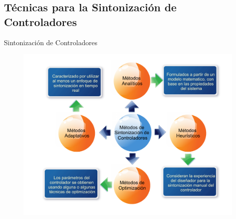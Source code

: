 \subsection{Técnicas para la Sintonización de Controladores}
\begin{frame}{Sintonización de Controladores}
	\vspace{-0.8cm}
	\begin{figure}
		\begin{center}
			\includegraphics[scale=0.39]{Introduccion/MetSintCtrl.pdf}  
		\end{center}
	\end{figure}
\end{frame}

